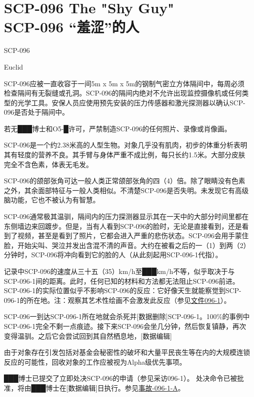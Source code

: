 \chapter[SCP-096 “羞涩”的人]{
    SCP-096 The "Shy Guy"\\
    SCP-096 “羞涩”的人
}

\label{chap:SCP-096}

SCP-096

Euclid

SCP-096应被一直收容于一间5m x 5m x 5m的钢制气密立方体隔间中，每周必须检查隔间有无裂缝或孔洞。SCP-096的隔间内绝对不允许出现监控摄像机或任何类型的光学工具。安保人员应使用预先安装的压力传感器和激光探测器以确认SCP-096是否处于隔间中。

若无███博士和O5-█许可，严禁制造SCP-096的任何照片、录像或肖像画。

SCP-096是一个约2.38米高的人型生物。对象几乎没有肌肉，初步的体重分析表明其有轻度的营养不良。其手臂与身体严重不成比例，每只长约1.5米。大部分皮肤完全不含色素，体表无毛发。

SCP-096的颌部张角可达一般人类正常颌部张角的四（4）倍。除了眼睛没有色素之外，其余面部特征与一般人类相似。不清楚SCP-096是否失明。未发现它有高级脑功能，它也不被认为有智慧。

SCP-096通常极其温驯，隔间内的压力探测器显示其在一天中的大部分时间里都在东侧墙边来回踱步。但是，当有人看到SCP-096的脸时，无论是直接看到，还是看到了视频，甚至是看到了照片，它都会进入严重的悲伤状态。SCP-096会用手蒙住脸，开始尖叫、哭泣并发出含混不清的声音。大约在被看之后的一（1）到两（2）分钟时，SCP-096将冲向看到它的脸的人（从此刻起用SCP-096-1代指）。

记录中SCP-096的速度从三十五（35）km\slash h至███km\slash h不等，似乎取决于与SCP-096-1间的距离。此时，任何已知的材料和方法都无法阻止SCP-096前进。SCP-096-1的实际位置似乎不影响SCP-096的反应：它好像天生就能察觉到SCP-096-1的所在地。注：观察其艺术性绘画不会激发此反应（参见\hyperref[sec:DOC-document-096-1]{文件096-1}）。

SCP-096一到达SCP-096-1所在地就会杀死并{[}数据删除]SCP-096-1。100\%的事例中SCP-096-1完全不剩一点痕迹。接下来SCP-096会坐几分钟，然后恢复镇静，再次变得温驯。之后它会尝试回到其自然栖息地，{[}数据编辑]

由于对象存在引发包括对基金会秘密性的破坏和大量平民丧生等在内的大规模连锁反应的可能性，回收对象的工作应被视为Alpha级优先事项。

███博士已提交了立即处决SCP-096的申请（参见采访096-1）。  处决命令已被批准，将由███博士在{[}数据编辑]日执行。参见\hyperref[sec:DOC-incident-096-1-a]{事故-096-1-A}。

